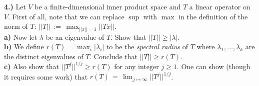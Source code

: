 \documentclass[11pt]{amsart}
\theoremstyle{definition}  %
\begin{document}
\vskip 0.1cm
\noindent
{\bf 4.)}  Let $V$ be a finite-dimensional inner product space and $T$ a linear operator on $V$. First of all, note that we can replace $\sup$ with $\max$ in the definition of the norm
of $T$:  $|| T || \, := \, \max_{||x || = 1} ||Tx||$. \\
{\bf a)} Now let $\lambda$ be an eigenvalue of $T$. Show that $ ||T || \geq |\lambda|$. \\
{\bf b)} We define $r(T) = \max_i |\lambda_i|$ to be the {\it spectral radius} of $T$ where $\lambda_1, \ldots, \lambda_k$ are the distinct eigenvalues of $T$. Conclude that
$||T|| \geq r(T)$. \\
{\bf c)} Also show that $||T^j||^{1/j} \geq r(T)$ for any integer $j \geq 1$. One can show (though it requires some work) that $r(T) \, = \, \lim_{j \mapsto \infty} ||T^j||^{1/j}$.\\ 
\end{document}
